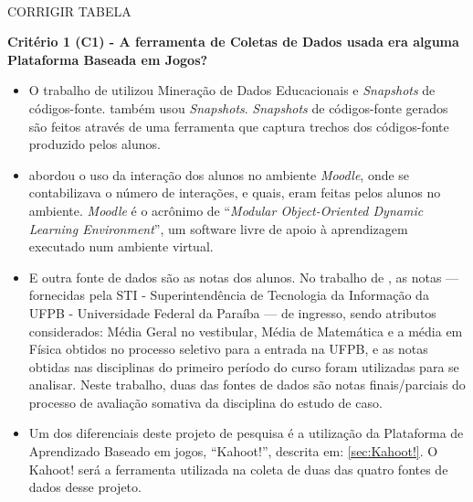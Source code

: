 \\ {\color{red} CORRIGIR TABELA}

\begin{comment}
\begin{table}[]
\caption{Características dos Trabalhos Relacionados e deste projeto de pesquisa}
\label{tab:my-table}
\resizebox{\textwidth}{!}{%
\begin{tabular}{c|c|c|c|c}
\begin{tabular}[c]{@{}c@{}}Artigos/Características\end{tabular} & C1 & C2 & C3 & C4 \\ \hline
\citeonline{ahadi2016early} &  & X &  &  \\
\citeonline{Castro-Wunsch2017} &  & X &  &  \\
\citeonline{gotardo2013prediccao} &  &  &  & X \\
\citeonline{DeBrito2014} &  & X &  & X \\ \hline
Esse trabalho & X & X & X & X
\end{tabular}%
}
\end{table}
\end{comment}

\textbf{Critério 1 (C1) - A ferramenta de Coletas de Dados usada era alguma Plataforma Baseada em Jogos?}

\begin{itemize}
    \item O trabalho de  utilizou Mineração de Dados Educacionais e \textit{Snapshots} de códigos-fonte.  também usou \textit{Snapshots}. \textit{Snapshots} de códigos-fonte gerados são feitos através de uma ferramenta que captura trechos dos códigos-fonte produzido pelos alunos.
    \item {} abordou o uso da interação dos alunos no ambiente \textit{Moodle}, onde se contabilizava o número de interações, e quais, eram feitas pelos alunos no ambiente. \textit{Moodle} é o acrônimo de ``\textit{Modular Object-Oriented Dynamic Learning Environment}'', um software livre de apoio à aprendizagem executado num ambiente virtual.
    \item E outra fonte de dados são as notas dos alunos. No trabalho de , as notas --- fornecidas pela STI - Superintendência de Tecnologia da Informação da UFPB - Universidade Federal da Paraíba --- de ingresso, sendo atributos considerados: Média Geral no vestibular, Média de Matemática e a média em Física obtidos no processo seletivo para a entrada na UFPB, e as notas obtidas nas disciplinas do primeiro período do curso foram utilizadas para se analisar. Neste trabalho, duas das fontes de dados são notas finais/parciais do processo de avaliação somativa da disciplina do estudo de caso.
    \item Um dos diferenciais deste projeto de pesquisa é a utilização da Plataforma de Aprendizado Baseado em jogos, ``Kahoot!'', descrita em: \ref{sec:Kahoot!}. O Kahoot! será a ferramenta utilizada na coleta de duas das quatro fontes de dados desse projeto.
\end{itemize}


